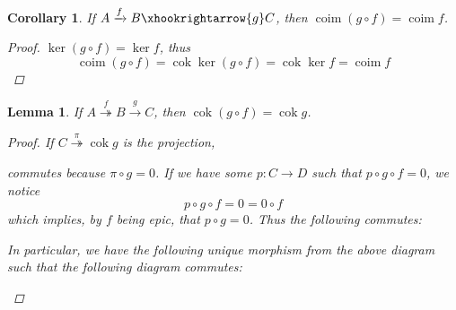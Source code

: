 \documentclass{article}
\DeclareMathOperator{\coim}{\mathrm{coim}}
\DeclareMathOperator{\cok}{\mathrm{cok}}
\newtheorem{corollary}{Corollary}[theorem]
\newtheorem{lemma}[theorem]{Lemma}
\begin{document}
\begin{corollary}\label{cor:comp with monic and coim}
        If $A\xrightarrow{f}B \xhookrightarrow{g} C$, then $\coim (g\circ f)=\coim f$.
        \begin{proof}
            $\ker (g\circ f)=\ker f$, thus 
            \[
            \coim (g\circ f)=\cok \ker (g\circ f)=\cok \ker f=\coim f
            \]
        \end{proof}
    \end{corollary}
\begin{lemma}\label{lem:comp with epic and cok}
    If $A\overset{f}\twoheadrightarrow B\xrightarrow{g}C$, then $\cok (g\circ f)=\cok g$.
    \begin{proof}
        If $C\overset{\pi}\twoheadrightarrow \cok g$ is the projection, 
        \begin{center}
        \end{center}
        commutes because $\pi \circ g=0$. If we have some $p:C\to D$ such that $p\circ g\circ f=0$, we notice
        \[
        p\circ g\circ f=0=0 \circ f
        \]
        which implies, by $f$ being epic, that $p\circ g=0$. Thus the following commutes:
        \begin{center}
        \end{center}
        In particular, we have the following unique morphism from the above diagram such that the following diagram commutes:
        \begin{center}
        \end{center}
    \end{proof}
\end{lemma}
    
\end{document}
